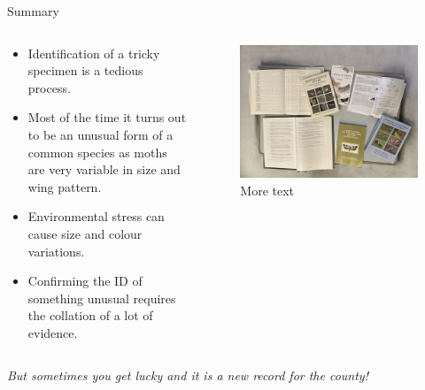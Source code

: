 \documentclass[
  ignorenonframetext,
]{beamer}
\providecommand{\tightlist}{%
  \setlength{\itemsep}{0pt}\setlength{\parskip}{0pt}}
\begin{document}
\begin{frame}{Summary}
\protect\hypertarget{summary}{}
\begin{columns}[T]
\begin{column}{0.5\textwidth}
\begin{itemize}
\tightlist
\item
  Identification of a tricky specimen is a tedious process.
\item
  Most of the time it turns out to be an unusual form of a common
  species as moths are very variable in size and wing pattern.
\item
  Environmental stress can cause size and colour variations.
\item
  Confirming the ID of something unusual requires the collation of a lot
  of evidence.
\end{itemize}
\end{column}

\begin{column}{0.5\textwidth}
\begin{figure}
\centering
\includegraphics{./images/research.jpg}
\caption{More text}
\end{figure}
\end{column}
\end{columns}

\emph{But sometimes you get lucky and it is a new record for the
county!}
\end{frame}
\end{document}
